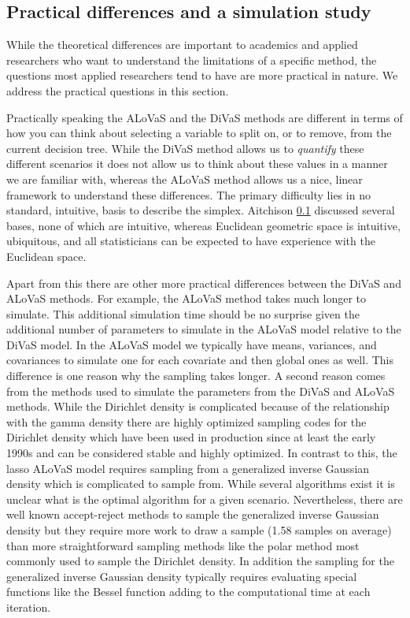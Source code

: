 \subsection{Practical differences and a simulation study}

While the theoretical differences are important to academics and applied researchers who want to understand the limitations of a specific method, the questions most applied researchers tend to have are more practical in nature. We address the practical questions in this section. 

Practically speaking the ALoVaS and the DiVaS methods are different in terms of how you can think about selecting a variable to split on, or to remove, from the current decision tree. While the DiVaS method allows us to \emph{quantify} these different scenarios it does not allow us to think about these values in a manner we are familiar with, whereas the ALoVaS method allows us a nice, linear framework to understand these differences. The primary difficulty lies in no standard, intuitive, basis to describe the simplex. Aitchison \ref{} discussed several bases, none of which are intuitive, whereas Euclidean geometric space is intuitive, ubiquitous, and all statisticians can be expected to have experience with the Euclidean space.   

Apart from this there are other more practical differences between the DiVaS and ALoVaS methods. For example, the ALoVaS method takes much longer to simulate. This additional simulation time should be no surprise given the additional number of parameters to simulate in the ALoVaS model relative to the DiVaS model. In the ALoVaS model we typically have means, variances, and covariances to simulate one for each covariate and then global ones as well. This difference is one reason why the sampling takes longer. A second reason comes from the methods used to simulate the parameters from the DiVaS and ALoVaS methods. While the Dirichlet density is complicated because of the relationship with the gamma density there are highly optimized sampling codes for the Dirichlet density which have been used in production since at least the early 1990s and can be considered stable and highly optimized. In contrast to this, the lasso ALoVaS model requires sampling from a generalized inverse Gaussian density which is complicated to sample from. While several algorithms exist it is unclear what is the optimal algorithm for a given scenario. Nevertheless, there are well known accept-reject methods to sample the generalized inverse Gaussian density but they require more work to draw a sample (1.58 samples on average)  than more straightforward sampling methods like the polar method most commonly used to sample the Dirichlet density. In addition the sampling for the generalized inverse Gaussian density typically requires evaluating special functions like the Bessel function adding to the computational time at each iteration. 

